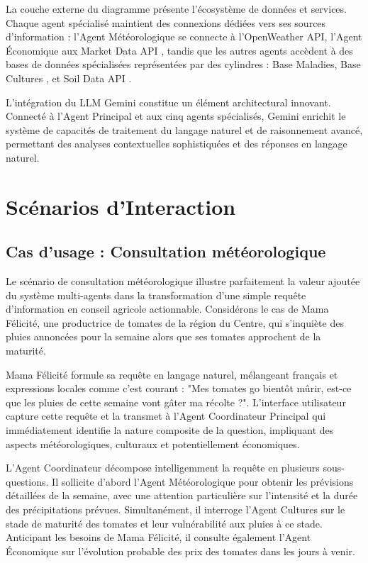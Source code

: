 La couche externe du diagramme présente l'écosystème de données et services. Chaque agent spécialisé maintient des connexions dédiées vers ses sources d'information : l'Agent Météorologique se connecte à l'OpenWeather API, l'Agent Économique aux Market Data API , tandis que les autres agents accèdent à des bases de données spécialisées représentées par des cylindres : Base Maladies, Base Cultures , et Soil Data API .

L'intégration du LLM Gemini constitue un élément architectural innovant. Connecté à l'Agent Principal et aux cinq agents spécialisés, Gemini enrichit le système de capacités de traitement du langage naturel et de raisonnement avancé, permettant des analyses contextuelles sophistiquées et des réponses en langage naturel.


\section{Scénarios d'Interaction}

\subsection{Cas d'usage : Consultation météorologique}

Le scénario de consultation météorologique illustre parfaitement la valeur ajoutée du système multi-agents dans la transformation d'une simple requête d'information en conseil agricole actionnable. Considérons le cas de Mama Félicité, une productrice de tomates de la région du Centre, qui s'inquiète des pluies annoncées pour la semaine alors que ses tomates approchent de la maturité.

Mama Félicité formule sa requête en langage naturel, mélangeant français et expressions locales comme c'est courant : "Mes tomates go bientôt mûrir, est-ce que les pluies de cette semaine vont gâter ma récolte ?". L'interface utilisateur capture cette requête et la transmet à l'Agent Coordinateur Principal qui immédiatement identifie la nature composite de la question, impliquant des aspects météorologiques, culturaux et potentiellement économiques.

L'Agent Coordinateur décompose intelligemment la requête en plusieurs sous-questions. Il sollicite d'abord l'Agent Météorologique pour obtenir les prévisions détaillées de la semaine, avec une attention particulière sur l'intensité et la durée des précipitations prévues. Simultanément, il interroge l'Agent Cultures sur le stade de maturité des tomates et leur vulnérabilité aux pluies à ce stade. Anticipant les besoins de Mama Félicité, il consulte également l'Agent Économique sur l'évolution probable des prix des tomates dans les jours à venir.

